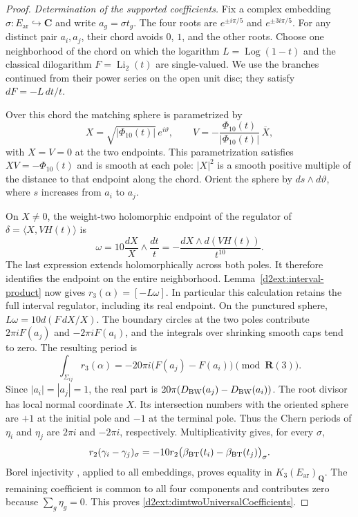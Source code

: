 \begin{proof}
\emph{Determination of the supported coefficients.}
Fix a complex embedding $\sigma:E_{\mathrm{ar}}\hookrightarrow\mathbf C$ and
write $a_g=\sigma t_g$. The four roots are
$e^{\pm i\pi/5}$ and $e^{\pm3i\pi/5}$. For any distinct pair
$a_i,a_j$, their chord avoids $0$, $1$, and the other roots. Choose
one neighborhood of the chord on which the logarithm
$L=\operatorname{Log}(1-t)$ and the classical dilogarithm
$F=\operatorname{Li}_2(t)$ are single-valued. We use the branches
continued from their power series on the open unit disc; they satisfy
$dF=-L\,dt/t$.

Over this chord the matching sphere is parametrized by
\[
 X=\sqrt{|\Phi_{10}(t)|}\,e^{i\vartheta},\qquad
 V=-\frac{\Phi_{10}(t)}{|\Phi_{10}(t)|}\,\overline X,
\]
with $X=V=0$ at the two endpoints. This parametrization satisfies
$XV=-\Phi_{10}(t)$ and is smooth at each pole: $|X|^2$ is a
smooth positive multiple of the distance to that endpoint along
the chord. Orient the sphere by $ds\wedge d\vartheta$, where $s$
increases from $a_i$ to $a_j$.

On $X\ne0$, the weight-two holomorphic endpoint of the regulator
of $\delta=\langle X,VH(t)\rangle$ is
\[
 \omega=10\frac{dX}{X}\wedge\frac{dt}{t}
        =-\frac{dX\wedge d(VH(t))}{t^{10}}.
\]
The last expression extends holomorphically across both poles.
It therefore identifies the endpoint on the entire neighborhood.
Lemma~\ref{d2ext:interval-product} now gives
$r_3(\alpha)=[-L\omega]$. In particular this calculation retains
the full interval regulator, including its real endpoint.
On the punctured sphere,
$L\omega=10d(F\,dX/X)$. The boundary circles at the two poles
contribute $2\pi iF(a_j)$ and $-2\pi iF(a_i)$, and the integrals
over shrinking smooth caps tend to zero. The resulting period is
\begin{equation}\label{d2ext:matching-period}
 \int_{\Sigma_{ij}}r_3(\alpha)
   =-20\pi i\bigl(F(a_j)-F(a_i)\bigr)
       \pmod{\mathbf R(3)}.
\end{equation}
Since $|a_i|=|a_j|=1$, the real part is
$20\pi(D_{\rm BW}(a_j)-D_{\rm BW}(a_i))$.
The root divisor has local normal coordinate $X$. Its intersection
numbers with the oriented sphere are $+1$ at the initial pole
and $-1$ at the terminal pole. Thus the Chern periods of
$\eta_i$ and $\eta_j$ are $2\pi i$ and $-2\pi i$, respectively.
Multiplicativity gives, for every $\sigma$,
\[
 r_2(\gamma_i-\gamma_j)_\sigma
   =-10r_2\bigl(\beta_{\rm BT}(t_i)-\beta_{\rm BT}(t_j)\bigr)_\sigma.
\]
Borel injectivity \cite[Section~6]{BunkeTamme}, applied to all
embeddings, proves equality in $K_3(E_{\mathrm{ar}})_{\mathbf Q}$. The remaining coefficient is common to
all four components and contributes zero because $\sum_g\eta_g=0$.
This proves \eqref{d2ext:dimtwoUniversalCoefficients}.


\end{proof}
